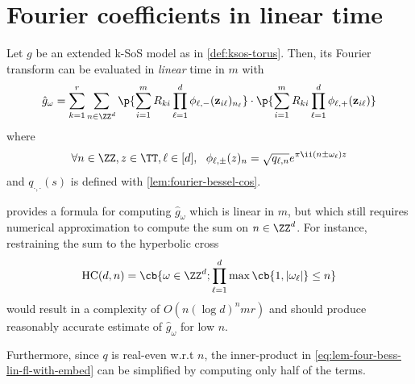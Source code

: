 \documentclass{article}
\begin{document}
\section{Fourier coefficients in linear time}
\label{sec:fourier-coeff-linear-time}

\begin{lemma}\label{lem:fourier-coeff-bessel-torus-linear}
  Let $g$ be an extended k-SoS model as in \cref{def:ksos-torus}. Then, its Fourier transform can be evaluated in \emph{linear} time in $m$ with
  \begin{equation}
    \hat{g}_\omega
    = \sum_{k = 1}^r \sum_{n \in \ZZ^d} \p{\sum_{i = 1}^m R_{ki} \prod_{\ell = 1}^d \phi_{\ell, -} (\mathbf{z}_{i \ell})_{n_\ell}} \cdot \p{\sum_{i = 1}^m R_{ki} \prod_{\ell = 1}^d \phi_{\ell, +} (\mathbf{z}_{i \ell})}
  \end{equation}
  where
  \begin{equation*}
    \forall n \in \ZZ, z \in \TT, \ell \in [d], ~~ \phi_{\ell, \pm} (z)_n = \sqrt{q_{\ell, n}} e^{\pi \ii (n \pm \omega_\ell) z}
  \end{equation*}
  and $q_{\cdot, \cdot}(s)$ is defined with \cref{lem:fourier-bessel-cos}.
\end{lemma}

 provides a formula for computing $\hat{g}_\omega$ which is linear in $m$, but which still requires numerical approximation to compute the sum on $n \in \ZZ^d$. For instance, restraining the sum to the hyperbolic cross \cite{dungHyperbolicCrossApproximation2017}
\begin{equation*}
  \mathrm{HC}(d, n) = \cb{\omega \in \ZZ^d; \prod_{\ell = 1}^d \max \cb{1, |\omega_\ell|} \leq n}
\end{equation*}
would result in a complexity of $O(n (\log d)^{n} m r)$ and should produce reasonably accurate estimate of $\hat{g}_\omega$ for low $n$.

Furthermore, since $q$ is real-even w.r.t $n$, the inner-product in \cref{eq:lem-four-bess-lin-fl-with-embed} can be simplified by computing only half of the terms.
\end{document}
